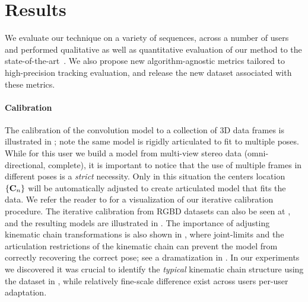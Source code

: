 \section{Results}
\label{sec:results}
We evaluate our technique on a variety of sequences, across a number of users 
and performed qualitative as well as quantitative  
evaluation of our method to the state-of-the-art~\cite{qian2014realtime,sridhar2015fast,tagliasacchi2015robust,sharp2015accurate,taylor2016concerto}. We also propose new algorithm-agnostic metrics tailored to high-precision tracking evaluation, and release the new \handy{} dataset associated with these metrics.

\paragraph{Calibration}
The calibration of the convolution model to a collection of 3D data frames is illustrated in ; note the same model is rigidly articulated to fit to multiple poses. While for this user we build a model from multi-view stereo data (omni-directional, complete), it is important to notice that the use of multiple frames in different poses is a \emph{strict} necessity. Only in this situation the centers location ${\{\mathbf{C}_n\}}$ will be automatically adjusted to create articulated model that  fits the data. We refer the reader to  for a visualization of our iterative calibration procedure. The iterative calibration from RGBD datasets can also be seen at , and the resulting models are illustrated in . The importance of adjusting kinematic chain transformations is also shown in , where joint-limits and the articulation restrictions of the kinematic chain can prevent the model from correctly recovering the correct pose; see a dramatization in . In our experiments we discovered it was crucial to identify the \emph{typical} kinematic chain structure using the dataset in , while relatively fine-scale difference exist across users per-user adaptation.

